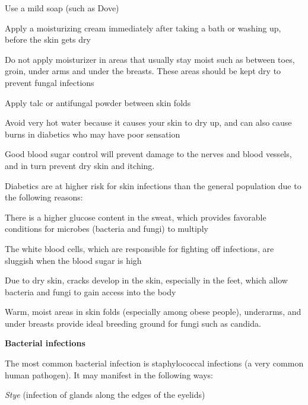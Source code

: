 {\item Use a mild soap (such as Dove)

 \item Apply a moisturizing cream immediately after taking a bath or washing up, before the skin gets dry

 \item Do not apply moisturizer in areas that usually stay moist such as between toes, groin, under arms and under the breasts. These areas should be kept dry to prevent fungal infections

 \item Apply talc or antifungal powder between skin folds

 \item Avoid very hot water because it causes your skin to dry up, and can also cause burns in diabetics who may have poor sensation

 \item Good blood sugar control will prevent damage to the nerves and blood vessels, and in turn prevent dry skin and itching.


Diabetics are at higher risk for skin infections than the general population due to the following reasons:

\item There is a higher glucose content in the sweat, which provides favorable conditions for microbes (bacteria and fungi) to multiply

 \item The white blood cells, which are responsible for fighting off infections, are sluggish when the blood sugar is high

 \item Due to dry skin, cracks develop in the skin, especially in the feet, which allow bacteria and fungi to gain access into the body

 \item Warm, moist areas in skin folds (especially among obese people), underarms, and under breasts provide ideal breeding ground for fungi such as candida.

\textbf{Bacterial infections}

The most common bacterial infection is staphylococcal infections (a very common human pathogen). It may manifest in the following ways:

\item \textit{Stye} (infection of glands along the edges of the eyelids)

}
